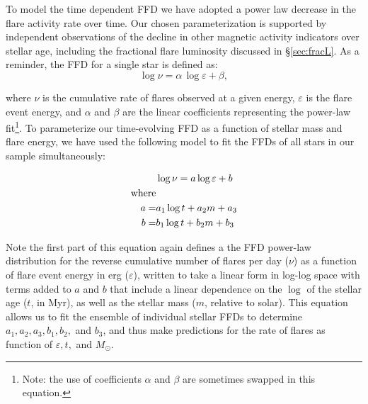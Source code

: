 \documentclass[preprint2]{aastex62}
\begin{document}
To model the time dependent FFD we have adopted a power law decrease in the flare activity rate over time. Our chosen parameterization is supported by independent observations of the decline in other magnetic activity indicators over stellar age, including the fractional flare luminosity discussed in \S\ref{sec:fracL}. As a reminder, the FFD for a single star is defined  \citep[e.g. Eqn. 18 from][]{lme1976} as:
\begin{equation}
\log \nu = \alpha \, \log \varepsilon + \beta,
\end{equation}

\noindent
where $\nu$ is the cumulative rate of flares observed at a given energy, $\varepsilon$ is the flare event energy, and $\alpha$ and $\beta$ are the linear coefficients representing the power-law fit\footnote{Note: the use of coefficients $\alpha$ and $\beta$ are sometimes swapped in this equation.}.
To parameterize our time-evolving FFD as a function of stellar mass and flare energy, we have used the following model to fit the FFDs of all stars in our sample simultaneously:

\begin{eqnarray}
\label{eqn:model}
& \log \nu = a \log \varepsilon + b\\
{\rm where}& \nonumber \\
a =& a_1 \log t + a_2 m + a_3 \nonumber\\
b =& b_1 \log t + b_2 m + b_3 \nonumber 
\end{eqnarray}

\noindent
Note the first part of this equation again defines a the FFD power-law distribution for the reverse cumulative number of flares per day ($\nu$) as a function of flare event energy in erg ($\varepsilon$), written to take a linear form in log-log space with terms added to $a$ and $b$ that include a linear dependence on the $\log$ of the stellar age ($t$, in Myr), as well as the stellar mass ($m$, relative to solar). This equation allows us to fit the ensemble of individual stellar FFDs to determine $a_1, a_2, a_3, b_1, b_2, $ and $b_3$, and thus make predictions for the rate of flares as function of $\varepsilon, t, $ and $M_\odot$.
\end{document}
